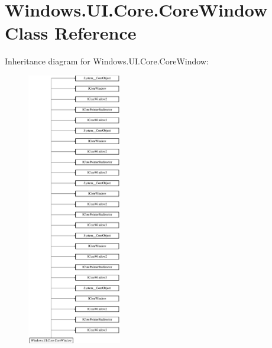 \hypertarget{class_windows_1_1_u_i_1_1_core_1_1_core_window}{}\section{Windows.\+U\+I.\+Core.\+Core\+Window Class Reference}
\label{class_windows_1_1_u_i_1_1_core_1_1_core_window}
Inheritance diagram for Windows.\+U\+I.\+Core.\+Core\+Window\+:\begin{figure}[H]
\begin{center}
\leavevmode
\includegraphics[height=12.000000cm]{class_windows_1_1_u_i_1_1_core_1_1_core_window}
\end{center}
\end{figure}
